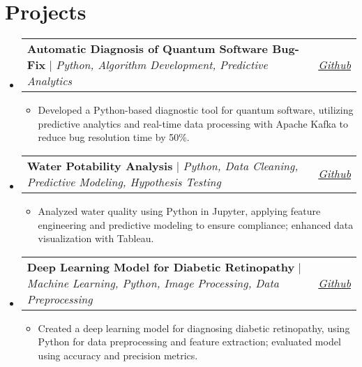 \documentclass[letterpaper,10pt]{article}
\makeatletter
\newcommand{\subheadingtitlevspace}{
\vspace{-3pt}
}
\newcommand{\resumeItem}[1]{
  \item{
    {#1 \vspace{-4pt}}
  }
}
\newcommand{\resumeProjectHeading}[2]{
    \item
    \begin{tabular*}{0.97\textwidth}{l@{\extracolsep{\fill}}r}
      #1 & \textit{ #2} \\
    \end{tabular*}\vspace{-9pt}
}
\newcommand{\resumeSubHeadingListStart}{\subheadingtitlevspace\begin{itemize}[leftmargin=0.15in, label={}]}
\newcommand{\resumeSubHeadingListEnd}{\end{itemize}}
\newcommand{\resumeItemListStart}{
\begin{itemize}}
\newcommand{\resumeItemListEnd}{
\end{itemize}\vspace{-8pt}}
\makeatother
\begin{document}

 \section{Projects}    
     \resumeSubHeadingListStart
        \resumeProjectHeading
           {\textbf{Automatic Diagnosis of Quantum Software Bug-Fix} $|$ \emph{Python, Algorithm Development, Predictive Analytics}}{\href{https://tinyurl.com/GITQUNTUM}{{\textit{Github}}}}
            \resumeItemListStart
            \resumeItem{Developed a Python-based diagnostic tool for quantum software, utilizing predictive analytics and real-time data processing with Apache Kafka to reduce bug resolution time by 50\%.}
           \resumeItemListEnd
       
        \resumeProjectHeading
           {\textbf{Water Potability Analysis} $|$ \emph{Python, Data Cleaning, Predictive Modeling, Hypothesis Testing}}{\href{https://github.com/123Ishan/Water-Potability}{{\textit{Github}}}}
            \resumeItemListStart
            \resumeItem{Analyzed water quality using Python in Jupyter, applying feature engineering and predictive modeling to ensure compliance; enhanced data visualization with Tableau.}
           \resumeItemListEnd
           
        \resumeProjectHeading
           {\textbf{Deep Learning Model for Diabetic Retinopathy} $|$ \emph{Machine Learning, Python, Image Processing, Data Preprocessing}}{\href{https://github.com/123Ishan/Diabatic-Retenipathy-Detection}{{\textit{Github}}}}
            \resumeItemListStart
            \resumeItem{Created a deep learning model for diagnosing diabetic retinopathy, using Python for data preprocessing and feature extraction; evaluated model using accuracy and precision metrics.}
           \resumeItemListEnd
     \resumeSubHeadingListEnd


\end{document}
